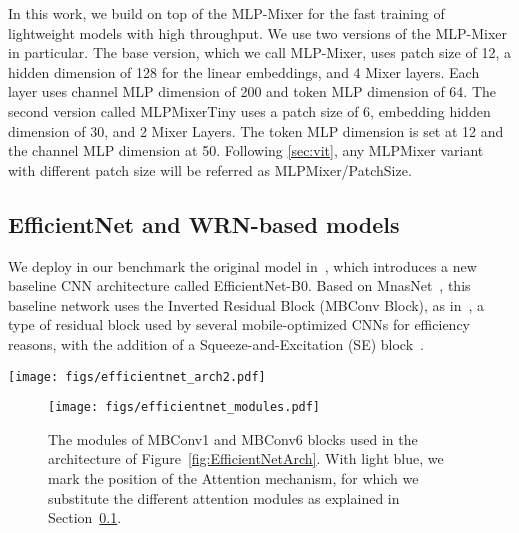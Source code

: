\documentclass[journal]{IEEEtran}
\begin{document}
In this work, we build on top of the MLP-Mixer for the fast training of lightweight models with high throughput. We use two versions of the MLP-Mixer in particular. The base version, which we call MLP-Mixer, uses patch size of 12, a hidden dimension of 128 for the linear embeddings, and  4 Mixer layers. Each layer uses channel MLP dimension of 200 and token MLP dimension of  64. The second version called MLPMixerTiny uses a patch size of 6, embedding hidden dimension of 30, and 2 Mixer Layers. The token MLP dimension is set at 12 and the channel MLP dimension at 50.
 Following \ref{sec:vit}, any MLPMixer variant with different patch size will be referred as MLPMixer/PatchSize.



\subsection{EfficientNet and WRN-based models}
\label{sec:variations}


We deploy in our benchmark the original model in~\citet{pmlr-v97-tan19a}, which introduces a new baseline CNN architecture called EfficientNet-B0. Based  on  MnasNet~\citep{Tan_2019_CVPR}, this baseline network uses the Inverted Residual Block (MBConv Block), as in~\cite{howard2017mobilenets}, a type of residual block used by several mobile-optimized CNNs for efficiency reasons, with the addition of a Squeeze-and-Excitation (SE) block~\citep{Hu_2018_CVPR}.

\begin{figure*}[ht]
 \texttt{[image: figs/efficientnet\_arch2.pdf]}
\caption{Our EfficientNet base model architecture implemented in the benchmark. MBConv1 and MBConv6 blocks are explained in Figure~\ref{fig:EfficientNetModules}.}
\label{fig:EfficientNetArch}
\end{figure*}

\begin{figure}[h]
 \texttt{[image: figs/efficientnet\_modules.pdf]}
 \centering
\caption{The modules of MBConv1 and MBConv6 blocks used in the architecture of Figure~\ref{fig:EfficientNetArch}. With light blue, we mark the position of the Attention mechanism, for which we substitute the different attention modules as explained in Section~\ref{sec:variations}.}
\label{fig:EfficientNetModules}
\end{figure}
\end{document}
